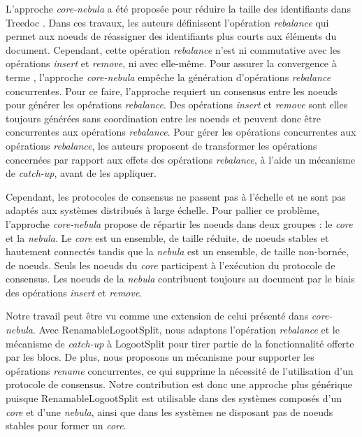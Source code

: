 \documentclass[12pt]{thesul}
\begin{document}
L'approche \emph{core-nebula}\cite{letia:hal-01248270,zawirski:hal-01248197} a été proposée pour réduire la taille des identifiants dans Treedoc \cite{5158449}.
Dans ces travaux, les auteurs définissent l'opération \emph{rebalance} qui permet aux noeuds de réassigner des identifiants plus courts aux éléments du document.
Cependant, cette opération \emph{rebalance} n'est ni commutative avec les opérations \emph{insert} et \emph{remove}, ni avec elle-même.
Pour assurer la convergence à terme \cite{10.1145/224057.224070}, l'approche \emph{core-nebula} empêche la génération d'opérations \emph{rebalance} concurrentes.
Pour ce faire, l'approche requiert un consensus entre les noeuds pour générer les opérations \emph{rebalance}.
Des opérations \emph{insert} et \emph{remove} sont elles toujours générées sans coordination entre les noeuds et peuvent donc être concurrentes aux opérations \emph{rebalance}.
Pour gérer les opérations concurrentes aux opérations \emph{rebalance}, les auteurs proposent de transformer les opérations concernées par rapport aux effets des opérations \emph{rebalance}, à l'aide un mécanisme de \emph{catch-up}, avant de les appliquer.

Cependant, les protocoles de consensus ne passent pas à l'échelle et ne sont pas adaptés aux systèmes distribués à large échelle.
Pour pallier ce problème, l'approche \emph{core-nebula} propose de répartir les noeuds dans deux groupes : le \emph{core} et la \emph{nebula}.
Le \emph{core} est un ensemble, de taille réduite, de noeuds stables et hautement connectés tandis que la \emph{nebula} est un ensemble, de taille non-bornée, de noeuds.
Seuls les noeuds du \emph{core} participent à l'exécution du protocole de consensus.
Les noeuds de la \emph{nebula} contribuent toujours au document par le biais des opérations \emph{insert} et \emph{remove}.

Notre travail peut être vu comme une extension de celui présenté dans \emph{core-nebula}.
Avec RenamableLogootSplit, nous adaptons l'opération \emph{rebalance} et le mécanisme de \emph{catch-up} à LogootSplit pour tirer partie de la fonctionnalité offerte par les blocs.
De plus, nous proposons un mécanisme pour supporter les opérations \emph{rename} concurrentes, ce qui supprime la nécessité de l'utilisation d'un protocole de consensus.
Notre contribution est donc une approche plus générique puisque RenamableLogootSplit est utilisable dans des systèmes composés d'un \emph{core} et d'une \emph{nebula}, ainsi que dans les systèmes ne disposant pas de noeuds stables pour former un \emph{core}.
\end{document}
